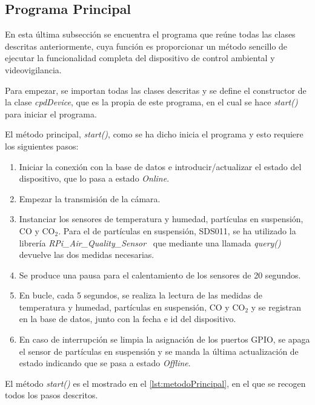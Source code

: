 \subsection{Programa Principal}\label{subsec:programa-principal}
En esta última subsección se encuentra el programa que reúne todas las clases descritas anteriormente, cuya función es proporcionar un método sencillo de ejecutar la funcionalidad completa del dispositivo de control ambiental y videovigilancia.

Para empezar, se importan todas las clases descritas y se define el constructor de la clase \textit{cpdDevice}, que es la propia de este programa, en el cual se hace \textit{start()} para iniciar el programa.

El método principal, \textit{start()}, como se ha dicho inicia el programa y esto requiere los siguientes pasos:
\begin{enumerate}
	\item Iniciar la conexión con la base de datos e introducir/actualizar el estado del dispositivo, que lo pasa a estado \textit{Online}.
	\item Empezar la transmisión de la cámara.
	\item Instanciar los sensores de temperatura y humedad, partículas en suspensión, CO y CO$_2$. Para el de partículas en suspensión, SDS011, se ha utilizado la librería \textit{RPi\_Air\_Quality\_Sensor}~\cite{rovai_python4ds_2021} que mediante una llamada \textit{query()} devuelve las dos medidas necesarias.
	\item Se produce una pausa para el calentamiento de los sensores de 20 segundos.
	\item En bucle, cada 5 segundos, se realiza la lectura de las medidas de temperatura y humedad, partículas en suspensión, CO y CO$_2$ y se registran en la base de datos, junto con la fecha e id del dispositivo.
	\item En caso de interrupción se limpia la asignación de los puertos GPIO, se apaga el sensor de partículas en suspensión y se manda la última actualización de estado indicando que se pasa a estado \textit{Offline}.
\end{enumerate}

El método \textit{start()} es el mostrado en el \autoref{lst:metodoPrincipal}, en el que se recogen todos los pasos descritos.
\pagebreak

